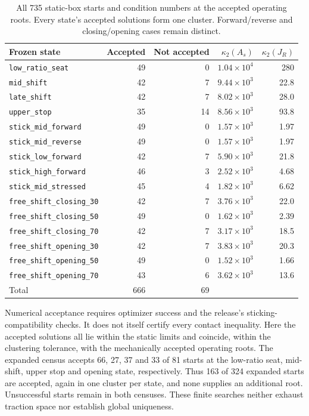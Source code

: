 \documentclass[11pt]{report}
\numberwithin{equation}{section}
\begin{document}
\begin{table}[!htbp]
\centering\small
\begin{tabular}{@{}lrrrr@{}}
\toprule
Frozen state & Accepted & Not accepted & $\kappa_2(A_s)$ & $\kappa_2(J_R)$ \\ \midrule
\texttt{low\_ratio\_seat} & 49 & 0 & $1.04\times10^4$ & 280 \\
\texttt{mid\_shift} & 42 & 7 & $9.44\times10^3$ & 22.8 \\
\texttt{late\_shift} & 42 & 7 & $8.02\times10^3$ & 28.0 \\
\texttt{upper\_stop} & 35 & 14 & $8.56\times10^3$ & 93.8 \\
\texttt{stick\_mid\_forward} & 49 & 0 & $1.57\times10^3$ & 1.97 \\
\texttt{stick\_mid\_reverse} & 49 & 0 & $1.57\times10^3$ & 1.97 \\
\texttt{stick\_low\_forward} & 42 & 7 & $5.90\times10^3$ & 21.8 \\
\texttt{stick\_high\_forward} & 46 & 3 & $2.52\times10^3$ & 4.68 \\
\texttt{stick\_mid\_stressed} & 45 & 4 & $1.82\times10^3$ & 6.62 \\
\texttt{free\_shift\_closing\_30} & 42 & 7 & $3.76\times10^3$ & 22.0 \\
\texttt{free\_shift\_closing\_50} & 49 & 0 & $1.62\times10^3$ & 2.39 \\
\texttt{free\_shift\_closing\_70} & 42 & 7 & $3.17\times10^3$ & 18.5 \\
\texttt{free\_shift\_opening\_30} & 42 & 7 & $3.83\times10^3$ & 20.3 \\
\texttt{free\_shift\_opening\_50} & 49 & 0 & $1.52\times10^3$ & 1.66 \\
\texttt{free\_shift\_opening\_70} & 43 & 6 & $3.62\times10^3$ & 13.6 \\
\midrule
Total & 666 & 69 & & \\
\bottomrule
\end{tabular}
\caption{All 735 static-box starts and condition numbers at the accepted
operating roots. Every state's accepted solutions form one cluster.
Forward/reverse and closing/opening cases remain distinct.}
\label{tab:closure_named_states}
\end{table}

Numerical acceptance requires optimizer success and the release's
sticking-compatibility checks. It does not itself certify every contact
inequality. Here the accepted solutions all lie within the static limits
and coincide, within the clustering tolerance, with the mechanically
accepted operating roots. The expanded census accepts 66, 27, 37 and 33 of
81 starts at the low-ratio seat, mid-shift, upper stop and opening state,
respectively. Thus 163 of 324 expanded starts are accepted, again in one
cluster per state, and none supplies an additional root. Unsuccessful
starts remain in both censuses. These finite searches neither exhaust
traction space nor establish global uniqueness.
\end{document}
